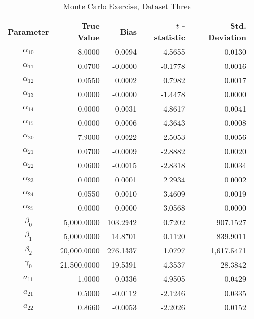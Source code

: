 \begin{table}\onehalfspacing
\begin{center}
\begin{threeparttable}
  \caption{Monte Carlo Exercise, Dataset Three}
  \label{Monte Carlo: Three}
  \begin{tabular}{crrrr}\toprule

  Parameter & True Value & Bias & $t$ - statistic & Std. Deviation \\
  \midrule
  $\alpha_{10}$ &    \phantom{20000}8.0000 &   -0.0094 &  -4.5655 &    0.0130 \\
  $\alpha_{11}$ &      0.0700 &    -0.0000 &  -0.1778 &     0.0016\\
  $\alpha_{12}$ &      0.0550 &     0.0002 &   0.7982 &     0.0017\\
  $\alpha_{13}$ &      0.0000 &    -0.0000 &  -1.4478 &     0.0000\\
  $\alpha_{14}$ &      0.0000 &    -0.0031 &  -4.8617 &     0.0041\\
  $\alpha_{15}$ &      0.0000 &     0.0006 &   4.3643 &     0.0008\\
  $\alpha_{20}$ &      7.9000 &    -0.0022 &  -2.5053 &     0.0056\\
  $\alpha_{21}$ &      0.0700 &    -0.0009 &  -2.8882 &     0.0020\\
  $\alpha_{22}$ &      0.0600 &     -0.0015 &         -2.8318  &        0.0034\\
  $\alpha_{23}$ &      0.0000 &      0.0001 &        -2.2934   &       0.0002\\
  $\alpha_{24}$ &      0.0550 &    0.0010   &       3.4609     &     0.0019\\
  $\alpha_{25}$ &      0.0000 &     0.0000  &        3.0568    &      0.0000\\
  $\beta_{0}$   &   5,000.0000 &  103.2942 &   0.7202 &   907.1527\\
  $\beta_{1}$   &   5,000.0000 &   14.8701 &   0.1120 &   839.9011\\
  $\beta_{2}$   &  20,000.0000 &  276.1337 &   1.0797 &  1,617.5471 \\
  $\gamma_{0}$  &  21,500.0000 &   19.5391 &   4.3537 &    28.3842\\
  $a_{11}$      &      1.0000 &    -0.0336 &  -4.9505 &     0.0429\\
  $a_{21}$      &      0.5000 &    -0.0112 &  -2.1246 &     0.0335\\
  $a_{22}$      &      0.8660 &    -0.0053 &  -2.2026 &     0.0152\\

\end{tabular}
\end{threeparttable}
\end{center}
\end{table}

